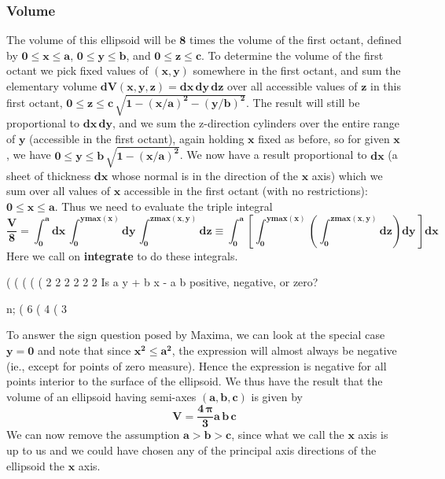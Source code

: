\documentclass[12pt]{article}
\begin{document}
\subsubsection*{Volume}
The volume of this ellipsoid will be $\mathbf{8}$ times the volume of the first octant,
  defined by $\mathbf{0 \leq x \leq a}$, $\mathbf{0 \leq y \leq b}$, and $\mathbf{0 \leq z \leq c}$.
To determine the volume of the first octant we pick fixed values of $\mathbf{(x,y)}$ somewhere
  in the first octant, and sum the elementary volume $\mathbf{dV(x,y,z) = dx\,dy\,dz}$ over all
  accessible values of $\mathbf{z}$ in this first octant,
  $\mathbf{0 \leq z \leq c\,\sqrt{1-(x/a)^{2} -(y/b)^{2}}}$.  
The result will still be proportional to $\mathbf{dx\,dy}$, and we sum the z-direction cylinders over
  the entire range of $\mathbf{y}$ (accessible in the first octant), again holding $\mathbf{x}$ fixed as before,
  so for given $\mathbf{x}$, we have $\mathbf{0 \leq y \leq b\,\sqrt{1 - (x/a)^{2}}}$.
We now have a result proportional to $\mathbf{dx}$ (a sheet of thickness $\mathbf{dx}$ whose normal is in
  the direction of the $\mathbf{x}$ axis) which we sum over all values of $\mathbf{x}$ accessible in
  the first octant (with no restrictions): $\mathbf{0 \leq x \leq a}$.
Thus we need to evaluate the triple integral
\begin{equation}
\mathbf{\frac{V}{8} =  \int_{0}^{a} dx \, \int_{0}^{ymax(x)} dy \, \int_{0}^{zmax(x,y)} dz \equiv 
  \int_{0}^{a} \left[ \int_{0}^{ymax(x)} \left( \int_{0}^{zmax(x,y)} dz \right)  dy \, \right] dx }
\end{equation}
Here we call on \textbf{integrate} to do these integrals.
\begin{myVerbatim}
(%
(%
(%
(%
(%
     2  2    2  2    2  2
Is  a  y  + b  x  - a  b   positive, negative, or zero?

n;
(%
                                       6
(%
                                  4 %
(%
                                       3
\end{myVerbatim} 
To answer the sign question posed by Maxima, we can look at the special case $\mathbf{y = 0}$ 
  and note that since $\mathbf{x^{2} \leq a^{2}}$, the expression will almost always be negative
  (ie., except for points of zero measure).
Hence the expression is negative for all points interior to the surface of the ellipsoid.
We thus have the result that the volume of an ellipsoid having semi-axes $\mathbf{(a,b,c)}$
  is given by
\begin{equation}
\mathbf{V = \frac{4\, \boldsymbol{\pi}}{3} a \,b \,c }
\end{equation}
We can now remove the assumption $\mathbf{a > b > c}$, since what we call the $\mathbf{x}$ axis is
 up to us and we could have chosen any of the principal axis directions of the
 ellipsoid the $\mathbf{x}$ axis.\\
\end{document}
